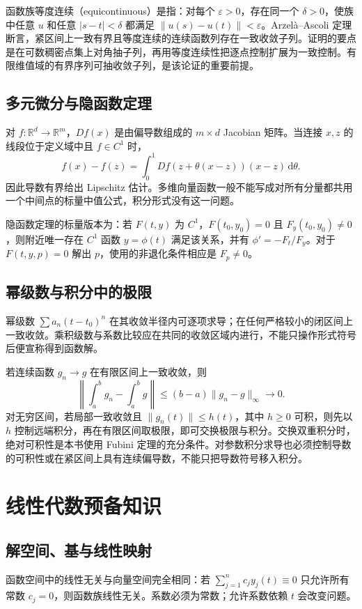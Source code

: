 \documentclass[UTF8,12pt,a4paper,fontset=fandol]{ctexbook}
\begin{document}
函数族等度连续（equicontinuous）是指：对每个 $\varepsilon>0$，存在同一个 $\delta>0$，使族中任意 $u$ 和任意 $|s-t|<\delta$ 都满足 $\|u(s)-u(t)\|<\varepsilon$。Arzelà--Ascoli 定理断言，紧区间上一致有界且等度连续的连续函数列存在一致收敛子列。证明的要点是在可数稠密点集上对角抽子列，再用等度连续性把逐点控制扩展为一致控制。有限维值域的有界序列可抽收敛子列，是该论证的重要前提。

\section{多元微分与隐函数定理}
对 $f:\mathbb R^d\to\mathbb R^m$，$Df(x)$ 是由偏导数组成的 $m\times d$ Jacobian 矩阵。当连接 $x,z$ 的线段位于定义域中且 $f\in C^1$ 时，
\[
 f(x)-f(z)=\int_0^1Df(z+\theta(x-z))(x-z)\,\mathrm d\theta.
\]
因此导数有界给出 Lipschitz 估计。多维向量函数一般不能写成对所有分量都共用一个中间点的标量中值公式，积分形式没有这一问题。

隐函数定理的标量版本为：若 $F(t,y)$ 为 $C^1$，$F(t_0,y_0)=0$ 且 $F_y(t_0,y_0)\ne0$，则附近唯一存在 $C^1$ 函数 $y=\phi(t)$ 满足该关系，并有 $\phi'=-F_t/F_y$。对于 $F(t,y,p)=0$ 解出 $p$，使用的非退化条件相应是 $F_p\ne0$。

\section{幂级数与积分中的极限}
幂级数 $\sum a_n(t-t_0)^n$ 在其收敛半径内可逐项求导；在任何严格较小的闭区间上一致收敛。乘积级数与系数比较应在共同的收敛区域内进行，不能只操作形式符号后便宣称得到函数解。

若连续函数 $g_n\to g$ 在有限区间上一致收敛，则
\[
 \left\|\int_a^b g_n-\int_a^b g\right\|\leq(b-a)\|g_n-g\|_\infty\to0.
\]
对无穷区间，若局部一致收敛且 $\|g_n(t)\|\leq h(t)$，其中 $h\geq0$ 可积，则先以 $h$ 控制远端积分，再在有限区间取极限，即可交换极限与积分。交换双重积分时，绝对可积性是本书使用 Fubini 定理的充分条件。对参数积分求导也必须控制导数的可积性或在紧区间上具有连续偏导数，不能只把导数符号移入积分。

\chapter{线性代数预备知识}
\label{app:ode-algebra}

\section{解空间、基与线性映射}
函数空间中的线性无关与向量空间完全相同：若 $\sum_{j=1}^n c_jy_j(t)\equiv0$ 只允许所有常数 $c_j=0$，则函数族线性无关。系数必须为常数；允许系数依赖 $t$ 会改变问题。
\end{document}
